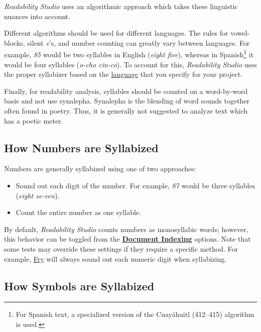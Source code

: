 \documentclass[
]{book}
\providecommand{\tightlist}{%
  \setlength{\itemsep}{0pt}\setlength{\parskip}{0pt}}
\theoremstyle{definition}
\theoremstyle{definition}
\theoremstyle{definition}
\theoremstyle{definition}
\theoremstyle{remark}
\begin{document}
\emph{Readability Studio} uses an algorithmic approach which takes these linguistic nuances into account.

Different algorithms should be used for different languages. The rules for vowel-blocks, silent \emph{e}'s, and number counting can greatly vary between languages. For example, \emph{85} would be two syllables in English (\emph{eight five}), whereas in Spanish\footnote{For Spanish text, a specialized version of the Cuayáhuitl (412--415) algorithm is used.} it would be four syllables (\emph{o-cho cin-co}). To account for this, \emph{Readability Studio} uses the proper syllabizer based on the \protect\hyperlink{project-settings}{language} that you specify for your project.

Finally, for readability analysis, syllables should be counted on a word-by-word basis and not use synalepha. Synalepha is the blending of word sounds together often found in poetry. Thus, it is generally not suggested to analyze text which has a poetic meter.

\hypertarget{how-numbers-are-syllabized}{%
\subsection*{How Numbers are Syllabized}\label{how-numbers-are-syllabized}}

Numbers are generally syllabized using one of two approaches:

\begin{itemize}
\tightlist
\item
  Sound out each digit of the number. For example, \emph{87} would be three syllables (\emph{eight se-ven}).
\item
  Count the entire number as one syllable.
\end{itemize}

By default, \emph{Readability Studio} counts numbers as monosyllabic words; however, this behavior can be toggled from the \protect\hyperlink{document-analysis}{\textbf{Document Indexing}} options. Note that some tests may override these settings if they require a specific method. For example, \protect\hyperlink{fry-test}{Fry} will always sound out each numeric digit when syllabizing.

\hypertarget{how-symbols-are-syllabized}{%
\subsection*{How Symbols are Syllabized}\label{how-symbols-are-syllabized}}
\end{document}
